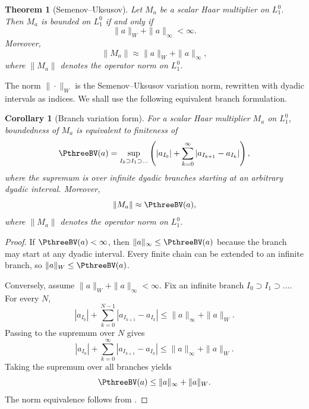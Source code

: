 \documentclass[11pt,reqno]{amsart}
\makeatletter
\theoremstyle{plain}
\newtheorem{theorem}{Theorem}[section]
\newtheorem{corollary}[corollary]{Corollary}
\theoremstyle{definition}
\newcounter{problempaper}
\newenvironment{problempaperbody}{%
  \setcounter{subsection}{0}%
  \setcounter{subsubsection}{0}%
  \setcounter{paragraph}{0}%
  \renewcommand{\thesubsection}{\arabic{subsection}}%
  \renewcommand{\thesubsubsection}{\thesubsection.\arabic{subsubsection}}%
  \renewcommand{\theparagraph}{\thesubsubsection.\arabic{paragraph}}%
  \let\problem@outersection\section
  \let\problem@outersubsection\subsection
  \let\problem@outersubsubsection\subsubsection
  \let\problem@outerparagraph\paragraph
  \let\section\problem@papersection
  \let\subsection\problem@papersubsection
  \let\subsubsection\problem@papersubsubsection
}{%
  \let\section\problem@outersection
  \let\subsection\problem@outersubsection
  \let\subsubsection\problem@outersubsubsection
  \let\paragraph\problem@outerparagraph
}
\newcommand{\problem@target}[2]{%
  \hypertarget{problem-\theproblempaper-#1-#2}{}%
}
\newcommand{\problem@paperheading}[3]{%
  \par\bigskip
  \problem@target{#1}{#2}%
  \noindent{\large\bfseries #2.\quad #3\par}%
  \nobreak\smallskip
}
\newcommand{\problem@papersubheading}[3]{%
  \par\medskip
  \problem@target{#1}{#2}%
  \noindent{\normalsize\bfseries #2.\quad #3\par}%
  \nobreak\smallskip
}
\newcommand{\problem@papersubsubheading}[3]{%
  \par\smallskip
  \problem@target{#1}{#2}%
  \noindent{\normalsize\itshape #2.\quad #3.\ }%
}
\def\problem@papersection{%
  \@ifstar{\problem@papersectionstar}{\problem@papersectionnostar}%
}
\def\problem@papersectionstar#1{%
  \par\bigskip\noindent{\large\bfseries #1\par}\nobreak\smallskip
}
\def\problem@papersectionnostar#1{%
  \refstepcounter{subsection}%
  \setcounter{subsubsection}{0}%
  \setcounter{paragraph}{0}%
  \problem@paperheading{section}{\thesubsection}{#1}%
  \problem@writecontentsline{section}{\thesubsection}{#1}%
}
\def\problem@papersubsection{%
  \@ifstar{\problem@papersubsectionstar}{\problem@papersubsectionnostar}%
}
\def\problem@papersubsectionstar#1{%
  \par\medskip\noindent{\normalsize\bfseries #1\par}\nobreak\smallskip
}
\def\problem@papersubsectionnostar#1{%
  \refstepcounter{subsubsection}%
  \setcounter{paragraph}{0}%
  \problem@papersubheading{subsection}{\thesubsubsection}{#1}%
  \problem@writecontentsline{subsection}{\thesubsubsection}{#1}%
}
\def\problem@papersubsubsection{%
  \@ifstar{\problem@papersubsubsectionstar}{\problem@papersubsubsectionnostar}%
}
\def\problem@papersubsubsectionstar#1{%
  \par\smallskip\noindent{\normalsize\itshape #1.\ }%
}
\def\problem@papersubsubsectionnostar#1{%
  \refstepcounter{paragraph}%
  \problem@papersubsubheading{subsubsection}{\theparagraph}{#1}%
  \problem@writecontentsline{subsubsection}{\theparagraph}{#1}%
}
\newcommand{\problem@writecontentsline}[3]{%
  \begingroup
  \protected@write\@auxout{}{%
    \string\problemcontentsentry{\theproblempaper}{#1}{#2}{#3}{\thepage}%
  }%
  \endgroup
}
\newcommand{\problemcontentsentry}[5]{%
  \@ifundefined{problemcontents@#1}{%
    \expandafter\gdef\csname problemcontents@#1\endcsname{}%
  }{}%
  \expandafter\g@addto@macro\csname problemcontents@#1\endcsname{%
    \problemcontentsline{#1}{#2}{#3}{#4}{#5}%
  }%
}
\newcommand{\problemcontentslink}[4]{%
  \hyperlink{problem-#1-#2-#3}{#4}%
}
\newcommand{\problemcontentsline}[5]{%
  \ifstrequal{#2}{section}{%
    \par\noindent
    \problemcontentslink{#1}{#2}{#3}{\makebox[2.5em][l]{#3}#4}%
    \nobreak\dotfill
    \problemcontentslink{#1}{#2}{#3}{#5}\par
  }{%
    \ifstrequal{#2}{subsection}{%
      \par\noindent\hspace*{1.5em}%
      \problemcontentslink{#1}{#2}{#3}{\makebox[3.5em][l]{#3}#4}%
      \nobreak\dotfill
      \problemcontentslink{#1}{#2}{#3}{#5}\par
    }{%
      \par\noindent\hspace*{3em}%
      \problemcontentslink{#1}{#2}{#3}{\makebox[4.5em][l]{#3}#4}%
      \nobreak\dotfill
      \problemcontentslink{#1}{#2}{#3}{#5}\par
    }%
  }%
}
\makeatother
\begin{document}
\begin{problempaperbody}
\begin{theorem}[Semenov--Uksusov]
\label{p3:thm:su-finite-chain}
Let $M_a$ be a scalar Haar multiplier on $L_1^0$. Then $M_a$ is bounded on $L_1^0$ if and only if
\begin{equation*}
        \|a\|_W+\|a\|_\infty<\infty .
\end{equation*}
Moreover,
\begin{equation*}
        \|M_a\|\approx \|a\|_W+\|a\|_\infty,
\end{equation*}
where $\|M_a\|$ denotes the operator norm on $L_1^0$.
\end{theorem}

The norm $\|\cdot\|_W$ is the Semenov--Uksusov variation norm, rewritten with dyadic intervals as indices. We shall use the following equivalent branch formulation.

\begin{corollary}[Branch variation form]
\label{p3:cor:su-branch}
For a scalar Haar multiplier $M_a$ on $L_1^0$, boundedness of $M_a$ is equivalent to finiteness of
\begin{equation*}
        \PthreeBV(a)=\sup_{I_0\supset I_1\supset\ldots}\left(|a_{I_0}|+\sum_{k=0}^{\infty}|a_{I_{k+1}}-a_{I_k}|\right),
\end{equation*}
where the supremum is over infinite dyadic branches starting at an arbitrary dyadic interval. Moreover,
\begin{equation*}
        \|M_a\|\approx \PthreeBV(a),
\end{equation*}
where $\|M_a\|$ denotes the operator norm on $L_1^0$.
\end{corollary}

\begin{proof}
If $\PthreeBV(a)<\infty$, then $\|a\|_\infty\leq \PthreeBV(a)$ because the branch may start at any dyadic interval.  Every finite chain can be extended to an infinite branch, so $\|a\|_W\leq \PthreeBV(a)$.

Conversely, assume $\|a\|_W+\|a\|_\infty<\infty$.  Fix an infinite branch $I_0\supset I_1\supset\ldots$.  For every $N$,
\begin{equation*}
        |a_{I_0}|+\sum_{k=0}^{N-1}|a_{I_{k+1}}-a_{I_k}|
        \leq \|a\|_\infty+\|a\|_W .
\end{equation*}
Passing to the supremum over $N$ gives
\begin{equation*}
        |a_{I_0}|+\sum_{k=0}^{\infty}|a_{I_{k+1}}-a_{I_k}|
        \leq \|a\|_\infty+\|a\|_W .
\end{equation*}
Taking the supremum over all branches yields
\begin{equation*}
        \PthreeBV(a)\leq \|a\|_\infty+\|a\|_W .
\end{equation*}
The norm equivalence follows from .
\end{proof}


\end{problempaperbody}
\end{document}
